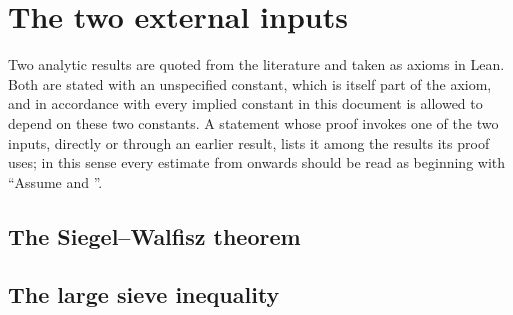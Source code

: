 \chapter{The two external inputs}\label{ch:inputs}

Two analytic results are quoted from the literature and taken as axioms in Lean. Both are stated
with an unspecified constant, which is itself part of the axiom, and in accordance with
 every implied constant in this document is allowed to depend on these two
constants. A statement whose proof invokes one of the two inputs, directly or through an earlier
result, lists it among the results its proof uses; in this sense every estimate from
 onwards should be read as beginning with ``Assume  and
''.

\section{The Siegel--Walfisz theorem}



\section{The large sieve inequality}


